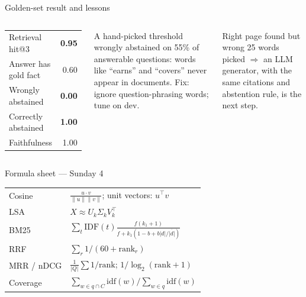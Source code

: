 \documentclass[aspectratio=169,11pt]{beamer}
\begin{document}
\begin{frame}{Golden-set result and lessons}
\begin{columns}[T]
\begin{bres}[Our result ($\tau^\ast=0.50$ from dev)]
\begin{tabular}{lr}
Retrieval hit@3 & \textbf{0.95}\\
Answer has gold fact & 0.60\\
Wrongly abstained & \textbf{0.00}\\
Correctly abstained & \textbf{1.00}\\
Faithfulness & 1.00\\
\end{tabular}
\end{bres}
\begin{bwarn}[Version 1]
A hand-picked threshold wrongly abstained on 55\% of answerable questions: words like ``earns'' and ``covers'' never appear in documents. Fix: ignore question-phrasing words; tune on dev.
\end{bwarn}
\begin{bex}
Right page found but wrong 25 words picked $\Rightarrow$ an LLM generator, with the same citations and abstention rule, is the next step.
\end{bex}
\end{columns}
\end{frame}

\begin{frame}{Formula sheet --- Sunday 4}
\renewcommand{\arraystretch}{1.35}
\begin{tabularx}{\linewidth}{l X}
\toprule
Cosine & $\frac{u\cdot v}{\lVert u\rVert\lVert v\rVert}$; \; unit vectors: $u^\top v$\\
LSA & $X\approx U_k\Sigma_kV_k^\top$\\
BM25 & $\sum_t\mathrm{IDF}(t)\frac{f(k_1+1)}{f+k_1(1-b+b|d|/\overline{|d|})}$\\
RRF & $\sum_r 1/(60+\mathrm{rank}_r)$\\
MRR / nDCG & $\frac1{|Q|}\sum 1/\mathrm{rank}$; \; $1/\log_2(\mathrm{rank}+1)$\\
Coverage & $\sum_{w\in q\cap C}\mathrm{idf}(w)/\sum_{w\in q}\mathrm{idf}(w)$\\
\bottomrule
\end{tabularx}
\end{frame}
\end{document}
